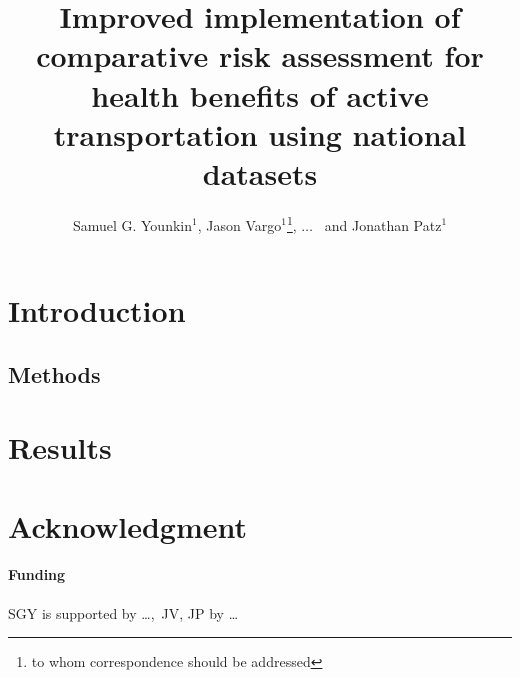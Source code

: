 \documentclass{bioinfo}
\begin{document}

\title[\package{}]{Improved implementation of comparative risk
  assessment for health benefits of active transportation using
  national datasets}
\author[Younkin \textit{et~al}]{Samuel G. Younkin$^{1}$,
  Jason Vargo$^{1}$\footnote{to whom correspondence should be addressed},
  $\ldots$
  \ and Jonathan Patz$^{1}$}
\address{$^{1}$Global Health Institute\\
University of Wisconsin{\textendash}Madison, Madison, WI USA\\
}


\maketitle

\begin{abstract}

\end{abstract}

\section{Introduction}


\begin{methods}
\section{Methods}

\end{methods}




\section{Results}


\section*{Acknowledgment}
\paragraph{Funding\textcolon} SGY is supported by \ldots,\ JV, JP by \ldots

%

%

\end{document}
